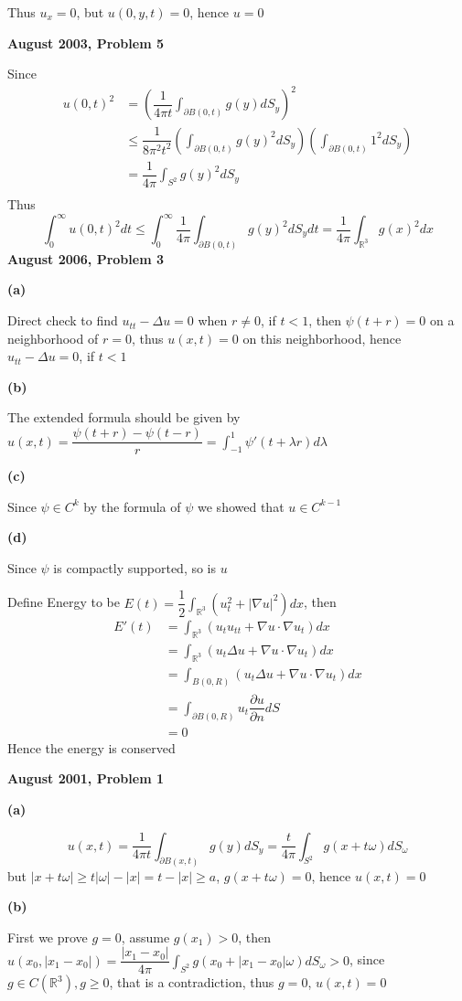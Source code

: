 \documentclass[12pt]{article}
\begin{document}
Thus $u_x=0$, but $u(0,y,t)=0$, hence $u=0$ \par
\textbf{August 2003, Problem 5} \par
Since
\[
\begin{aligned}
u(0,t)^2
&=\left( \dfrac{1}{4\pi t}\int_{\partial B(0,t)}g(y)dS_y \right)^2 \\
&\leq \dfrac{1}{8\pi^2t^2}\left(\int_{\partial B(0,t)}g(y)^2dS_y\right)\left(\int_{\partial B(0,t)}1^2dS_y\right) \\
&=\dfrac{1}{4\pi}\int_{S^2}g(y)^2dS_y \\
\end{aligned}
\]
Thus
\[
\int_0^\infty u(0,t)^2dt\leq \int_0^\infty\dfrac{1}{4\pi}\int_{\partial B(0,t)}g(y)^2dS_ydt=\dfrac{1}{4\pi}\int_{\mathbb{R}^3}g(x)^2dx
\]
\textbf{August 2006, Problem 3} \par
\textbf{(a)} \par
Direct check to find $u_{tt}-\Delta u=0$ when $r\neq 0$, if $t<1$, then $\psi(t+r)=0$ on a neighborhood of $r=0$, thus $u(x,t)=0$ on this neighborhood, hence $u_{tt}-\Delta u=0$, if $t<1$ \par
\textbf{(b)} \par
The extended formula should be given by $\displaystyle u(x,t)=\dfrac{\psi(t+r)-\psi(t-r)}{r}=\int_{-1}^1\psi'(t+\lambda r)d\lambda $ \par
\textbf{(c)} \par
Since $\psi\in C^k$ by the formula of $\psi$ we showed that $u\in C^{k-1}$ \par
\textbf{(d)} \par
Since $\psi$ is compactly supported, so is $u$ \par
Define Energy to be $\displaystyle E(t)=\dfrac{1}{2}\int_{\mathbb{R}^3}\left(u_t^2+|\nabla u|^2\right)dx$, then 
\[
\begin{aligned}
E'(t)
&=\int_{\mathbb{R}^3}\left(u_tu_{tt}+\nabla u\cdot\nabla u_t\right)dx \\
&=\int_{\mathbb{R}^3}\left(u_t\Delta u+\nabla u\cdot\nabla u_t\right)dx \\
&=\int_{B(0,R)}\left(u_t\Delta u+\nabla u\cdot\nabla u_t\right)dx \\
&=\int_{\partial B(0,R)}u_t\dfrac{\partial u}{\partial n}dS \\
&=0
\end{aligned}
\]
Hence the energy is conserved \par
\textbf{August 2001, Problem 1} \par
\textbf{(a)} \par
$$ u(x,t)=\dfrac{1}{4\pi t}\int_{\partial B(x,t)}g(y)dS_y=\dfrac{t}{4\pi}\int_{S^2}g(x+t\omega)dS_\omega $$
but $|x+t\omega|\geq t|\omega|-|x|=t-|x|\geq a$, $g(x+t\omega)=0$, hence $u(x,t)=0$ \par
\textbf{(b)} \par
First we prove $g=0$, assume $g(x_1)>0$, then $\displaystyle u(x_0,|x_1-x_0|)=\dfrac{|x_1-x_0|}{4\pi}\int_{S^2}g(x_0+|x_1-x_0|\omega)dS_\omega >0$, since $g\in C(\mathbb{R}^3), g\geq 0$, that is a contradiction, thus $g=0$, $u(x,t)=0$ \par
\end{document}
